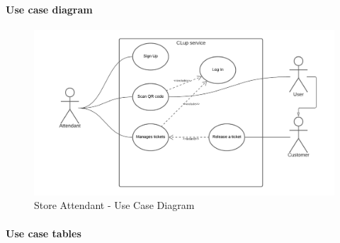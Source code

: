 \documentclass[table, 12pt]{article}
\begin{document}
\paragraph{Use case diagram}
\begin{figure}[H]
    \begin{center}
        \includegraphics[width=\textwidth]{assets/Use-Case-Diagrams/use_case_diagram_assistant.png}
        \caption{Store Attendant - Use Case Diagram}
    \end{center}
\end{figure}




\paragraph{Use case tables}
\end{document}
